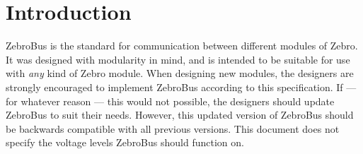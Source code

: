 \section{Introduction}
ZebroBus is the standard for communication between different modules of Zebro.
It was designed with modularity in mind, and is intended to be suitable for use with \emph{any} kind of Zebro module.
When designing new modules, the designers are strongly encouraged to implement ZebroBus according to this specification.
If --- for whatever reason --- this would not possible, the designers should update ZebroBus to suit their needs.
However, this updated version of ZebroBus should be backwards compatible with all previous versions.
This document does not specify the voltage levels ZebroBus should function on.